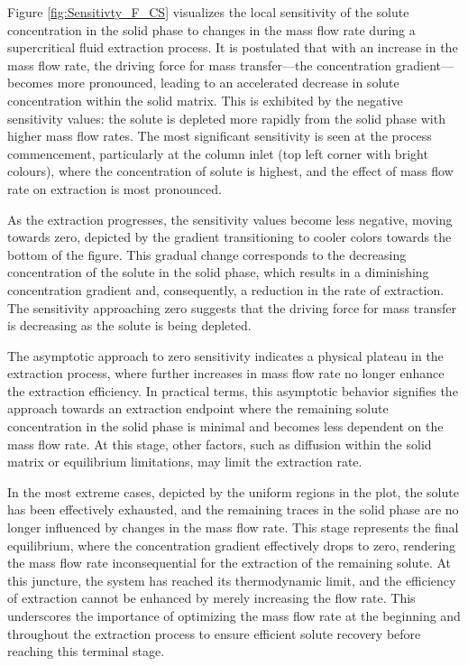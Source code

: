 \documentclass[../Article_Sensitivity_Analsysis.tex]{subfiles}
\begin{document}
   Figure \ref{fig:Sensitivty_F_CS} visualizes the local sensitivity of the solute concentration in the solid phase to changes in the mass flow rate during a supercritical fluid extraction process. It is postulated that with an increase in the mass flow rate, the driving force for mass transfer—the concentration gradient—becomes more pronounced, leading to an accelerated decrease in solute concentration within the solid matrix. This is exhibited by the negative sensitivity values: the solute is depleted more rapidly from the solid phase with higher mass flow rates. The most significant sensitivity is seen at the process commencement, particularly at the column inlet (top left corner with bright colours), where the concentration of solute is highest, and the effect of mass flow rate on extraction is most pronounced.
   
   As the extraction progresses, the sensitivity values become less negative, moving towards zero, depicted by the gradient transitioning to cooler colors towards the bottom of the figure. This gradual change corresponds to the decreasing concentration of the solute in the solid phase, which results in a diminishing concentration gradient and, consequently, a reduction in the rate of extraction. The sensitivity approaching zero suggests that the driving force for mass transfer is decreasing as the solute is being depleted.
   
   The asymptotic approach to zero sensitivity indicates a physical plateau in the extraction process, where further increases in mass flow rate no longer enhance the extraction efficiency. In practical terms, this asymptotic behavior signifies the approach towards an extraction endpoint where the remaining solute concentration in the solid phase is minimal and becomes less dependent on the mass flow rate. At this stage, other factors, such as diffusion within the solid matrix or equilibrium limitations, may limit the extraction rate.
   
   In the most extreme cases, depicted by the uniform regions in the plot, the solute has been effectively exhausted, and the remaining traces in the solid phase are no longer influenced by changes in the mass flow rate. This stage represents the final equilibrium, where the concentration gradient effectively drops to zero, rendering the mass flow rate inconsequential for the extraction of the remaining solute. At this juncture, the system has reached its thermodynamic limit, and the efficiency of extraction cannot be enhanced by merely increasing the flow rate. This underscores the importance of optimizing the mass flow rate at the beginning and throughout the extraction process to ensure efficient solute recovery before reaching this terminal stage.
   
\end{document}
